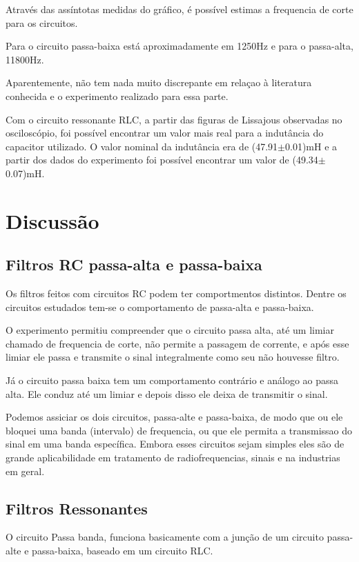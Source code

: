 \documentclass[11pt,a4paper]{article}
\begin{document}
Através das assíntotas medidas do gráfico, é possível estimas a frequencia de corte para os circuitos. 

Para o circuito passa-baixa está aproximadamente em 1250Hz e para o passa-alta, 11800Hz.

Aparentemente, não tem nada muito discrepante em relaçao à literatura conhecida e o experimento realizado para essa parte.

Com o circuito ressonante RLC, a partir das figuras de Lissajous observadas no osciloscópio, foi possível encontrar um valor mais real para a indutância do capacitor utilizado. O valor nominal da indutância era de (47.91$\pm$0.01)mH e a partir dos dados do experimento foi possível encontrar um valor de (49.34$\pm$0.07)mH.


\section{Discussão}
\subsection{Filtros RC passa-alta e passa-baixa}

Os filtros feitos com circuitos RC podem ter comportmentos distintos. Dentre os circuitos estudados tem-se o comportamento de passa-alta e passa-baixa.

O experimento permitiu compreender que o circuito passa alta, até um limiar chamado de frequencia de corte, não permite a passagem de corrente, e após esse limiar ele passa e transmite o sinal integralmente como seu não houvesse filtro.

Já o circuito passa baixa tem um comportamento contrário e análogo ao passa alta. Ele conduz até um limiar e depois disso ele deixa de transmitir o sinal.

Podemos assiciar os dois circuitos, passa-alte e passa-baixa, de modo que ou ele bloquei uma banda (intervalo) de frequencia, ou que ele permita a transmissao do sinal em uma banda específica. Embora esses circuitos sejam simples eles são de grande aplicabilidade em tratamento de radiofrequencias, sinais e na industrias em geral.

\subsection{Filtros Ressonantes}
O circuito Passa banda, funciona basicamente com a junção de um circuito passa-alte e passa-baixa, baseado em um circuito RLC.
\end{document}
